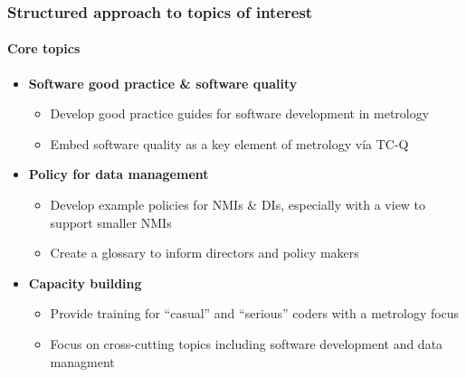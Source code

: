 \documentclass{beamer}
\begin{document}
    \begin{frame}
        \frametitle{Structured approach to topics of interest}
        \framesubtitle{Core topics}
        \begin{itemize}
            \item \textbf{Software good practice \& software quality}
            \begin{itemize}
                \item Develop good practice guides for software development in metrology
                \item Embed software quality as a key element of metrology vía TC-Q
            \end{itemize}
            \item \textbf{Policy for data management}
            \begin{itemize}
                \item Develop example policies for NMIs \& DIs, especially with a view to support smaller NMIs
                \item Create a glossary to inform directors and policy makers
            \end{itemize}
            \item \textbf{Capacity building}
            \begin{itemize}
                \item Provide training for ``casual'' and ``serious'' coders with a metrology focus
                \item Focus on cross-cutting topics including software development and data managment
            \end{itemize}
        \end{itemize}
    \end{frame}
\end{document}
